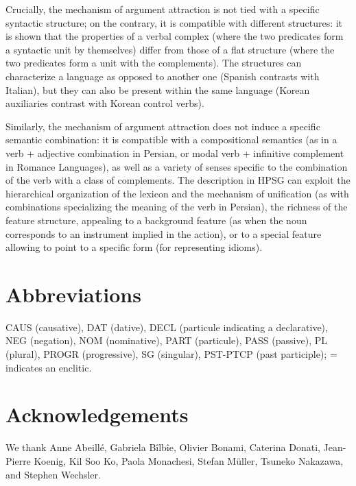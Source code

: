 \documentclass[output=paper
                ,modfonts
                ,nonflat
	        ,collection
	        ,collectionchapter
	        ,collectiontoclongg
 	        ,biblatex
                ,babelshorthands
                ,newtxmath
                ,draftmode
                ,colorlinks, citecolor=brown
]{./langsci/langscibook}
\begin{document}
{Crucially, the mechanism of argument attraction is not tied with a specific syntactic structure; on the contrary, it is compatible with different structures: it is shown that the properties of a verbal complex (where the two predicates form a syntactic unit by themselves) differ from those of a flat structure (where the two predicates form a unit with the complements). The structures can characterize a language as opposed to another one (Spanish contrasts with Italian), but they can also be present within the same language (Korean auxiliaries contrast with Korean control verbs).

Similarly, the mechanism of argument attraction does not induce a specific semantic combination: it is compatible with a compositional semantics (as in a verb + adjective combination in Persian, or modal verb + infinitive complement in Romance Languages), as well as a variety of senses specific to the combination of the verb with a class of complements. The description in HPSG can exploit the hierarchical organization of the lexicon and the mechanism of unification (as with combinations specializing the meaning of the verb in Persian), the richness of the feature structure, appealing to a background feature (as when the noun corresponds to an instrument implied in the action), or to a special feature allowing to point to a specific form (for representing idioms).    

} %

\section*{Abbreviations}

CAUS (causative), DAT (dative), DECL (particule indicating a declarative), 
NEG (negation), NOM (nominative), PART (particule), PASS (passive), PL (plural), PROGR
(progressive), SG (singular), PST-PTCP (past participle); = indicates an enclitic.

\section*{Acknowledgements}

We thank Anne Abeill\'e, Gabriela B\^ilb\^ie, Olivier Bonami, Caterina Donati,
  Jean-Pierre Koenig, Kil Soo Ko, Paola Monachesi, Stefan Müller, Tsuneko Nakazawa, and Stephen
  Wechsler. 

{\sloppy
	\printbibliography[heading=subbibliography,notkeyword=this]
}
\end{document}
